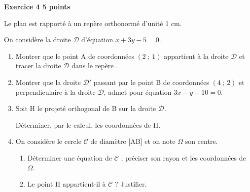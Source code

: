 \textbf{\large Exercice 4 \hfill 5 points}

\bigskip

Le plan est rapporté à un repère orthonormé \Oij{} d'unité 1 cm.

On considère la droite $\mathcal D$ d'équation $x+3y-5=0$.

\medskip

\begin{enumerate}
\item Montrer que le point A de coordonnées $(2~;~1)$ appartient à la droite $\mathcal D$ et tracer la droite $\mathcal D$ dans le repère \Oij.
\item Montrer que la droite $\mathcal D'$ passant par le point B de coordonnées $(4~;~2)$ et perpendiculaire à la droite $\mathcal D$, admet pour équation $3x-y-10=0$.
\item Soit H le projeté orthogonal de B sur la droite $\mathcal D$.

Déterminer, par le calcul, les coordonnées de H.
\item On considère le cercle $\mathcal C$ de diamètre [AB] et on note $\Omega$ son centre.
	\begin{enumerate}
		\item Déterminer une équation de $\mathcal C$ ; préciser son rayon et les coordonnées de $\Omega$.
		\item Le point H appartient-il à $\mathcal C$ ? Justifier.
	\end{enumerate}
\end{enumerate}

